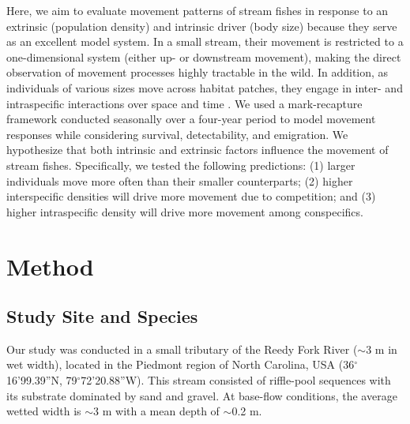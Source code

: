 \documentclass[11pt, class=article, crop=false]{standalone}
\begin{document}
Here, we aim to evaluate movement patterns of stream fishes in response to an extrinsic (population density) and intrinsic driver (body size) because they serve as an excellent model system. In a small stream, their movement is restricted to a one-dimensional system (either up- or downstream movement), making the direct observation of movement processes highly tractable in the wild. In addition, as individuals of various sizes move across habitat patches, they engage in inter- and intraspecific interactions over space and time \citep{brownHabitatHeterogeneityActivity2010, davidsonSeasonalSpatialHydrological2012, robinsonEffectsMultiyearExperimental2003, albaneseEcologicalCorrelatesFish2004, nakayamaFinescaleMovementEcology2018, pettyRestrictedMovementMottled2004, robertsSpatiotemporalVariabilityStream2007}.
We used a mark-recapture framework conducted seasonally over a four-year period to model movement responses while considering survival, detectability, and emigration. 
We hypothesize that both intrinsic and extrinsic factors influence the movement of stream fishes.
Specifically, we tested the following predictions:  (1) larger individuals move more often than their smaller counterparts; (2) higher interspecific densities will drive more movement due to competition; and (3) higher intraspecific density will drive more movement among conspecifics.

\section{Method}

\subsection{Study Site and Species}

Our study was conducted in a small tributary of the Reedy Fork River ($\sim$3 m in wet width), located in the Piedmont region of North Carolina, USA (36$^\circ$16’99.39”N, 79$^\circ$72’20.88”W). 
This stream consisted of riffle-pool sequences with its substrate dominated by sand and gravel.
At base-flow conditions, the average wetted width is $\sim$3 m with a mean depth of $\sim$0.2 m. 
\end{document}
